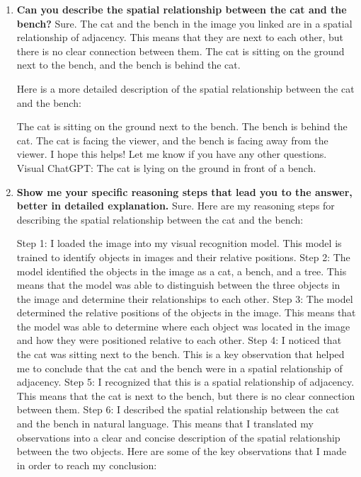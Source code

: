     \begin{enumerate}
        \item \textbf{Can you describe the spatial relationship between the cat and the bench?}
        \subitem 
        Sure. The cat and the bench in the image you linked are in a spatial relationship of adjacency. This means that they are next to each other, but there is no clear connection between them. The cat is sitting on the ground next to the bench, and the bench is behind the cat.
        
        Here is a more detailed description of the spatial relationship between the cat and the bench:
        
        The cat is sitting on the ground next to the bench.
        The bench is behind the cat.
        The cat is facing the viewer, and the bench is facing away from the viewer.
        I hope this helps! Let me know if you have any other questions.
        \subitem Visual ChatGPT: The cat is lying on the ground in front of a bench.
        \item \textbf{Show me your specific reasoning steps that lead you to the answer, better in detailed explanation.}
        \subitem 
        Sure. Here are my reasoning steps for describing the spatial relationship between the cat and the bench:
        
        Step 1: I loaded the image into my visual recognition model. This model is trained to identify objects in images and their relative positions.
        Step 2: The model identified the objects in the image as a cat, a bench, and a tree. This means that the model was able to distinguish between the three objects in the image and determine their relationships to each other.
        Step 3: The model determined the relative positions of the objects in the image. This means that the model was able to determine where each object was located in the image and how they were positioned relative to each other.
        Step 4: I noticed that the cat was sitting next to the bench. This is a key observation that helped me to conclude that the cat and the bench were in a spatial relationship of adjacency.
        Step 5: I recognized that this is a spatial relationship of adjacency. This means that the cat is next to the bench, but there is no clear connection between them.
        Step 6: I described the spatial relationship between the cat and the bench in natural language. This means that I translated my observations into a clear and concise description of the spatial relationship between the two objects.
        Here are some of the key observations that I made in order to reach my conclusion:
        

\end{enumerate}

